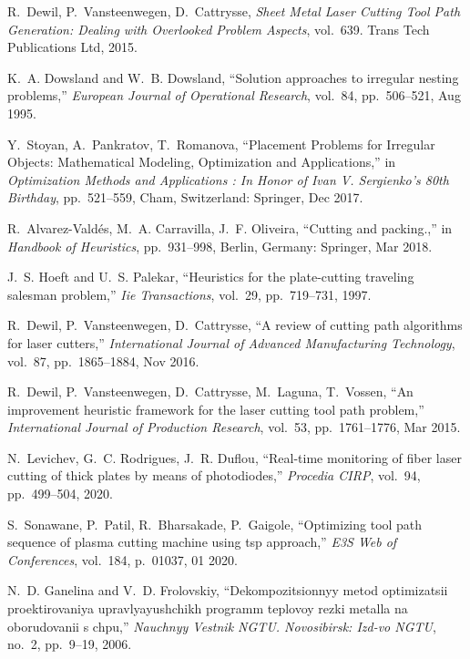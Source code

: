 \begin{thebibliography}{10}
R.~Dewil, P.~Vansteenwegen, D.~Cattrysse, {\em {Sheet Metal Laser Cutting
  Tool Path Generation: Dealing with Overlooked Problem Aspects}}, vol.~639.
\newblock Trans Tech Publications Ltd, 2015.

K.~A. Dowsland and W.~B. Dowsland, ``{Solution approaches to irregular nesting
  problems},'' {\em European Journal of Operational Research}, vol.~84,
  pp.~506--521, Aug 1995.

Y.~Stoyan, A.~Pankratov, T.~Romanova, ``{Placement Problems for Irregular
  Objects: Mathematical Modeling, Optimization and Applications},'' in {\em
  {Optimization Methods and Applications : In Honor of Ivan V. Sergienko's 80th
  Birthday}}, pp.~521--559, Cham, Switzerland: Springer, Dec 2017.

R.~Alvarez-Vald{\'e}s, M.~A. Carravilla, J.~F. Oliveira, ``Cutting and
  packing.,'' in {\em {Handbook of Heuristics}}, pp.~931--998, Berlin, Germany:
  Springer, Mar 2018.

J.~S. Hoeft and U.~S. Palekar, ``Heuristics for the plate-cutting traveling
  salesman problem,'' {\em Iie Transactions}, vol.~29, pp.~719--731, 1997.

R.~Dewil, P.~Vansteenwegen, D.~Cattrysse, ``{A review of cutting path
  algorithms for laser cutters},'' {\em International Journal of Advanced
  Manufacturing Technology}, vol.~87, pp.~1865--1884, Nov 2016.

R.~Dewil, P.~Vansteenwegen, D.~Cattrysse, M.~Laguna, T.~Vossen, ``{An
  improvement heuristic framework for the laser cutting tool path problem},''
  {\em International Journal of Production Research}, vol.~53, pp.~1761--1776,
  Mar 2015.

N.~Levichev, G.~C. Rodrigues, J.~R. Duflou, ``Real-time monitoring of fiber
  laser cutting of thick plates by means of photodiodes,'' {\em Procedia CIRP},
  vol.~94, pp.~499--504, 2020.

S.~Sonawane, P.~Patil, R.~Bharsakade, P.~Gaigole, ``Optimizing tool path
  sequence of plasma cutting machine using tsp approach,'' {\em E3S Web of
  Conferences}, vol.~184, p.~01037, 01 2020.

N.~D. Ganelina and V.~D. Frolovskiy, ``Dekompozitsionnyy metod optimizatsii
  proektirovaniya upravlyayushchikh programm teplovoy rezki metalla na
  oborudovanii s chpu,'' {\em Nauchnyy Vestnik NGTU. Novosibirsk: Izd-vo NGTU},
  no.~2, pp.~9--19, 2006.


\end{thebibliography}
